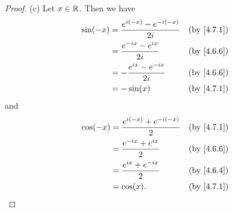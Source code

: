 \begin{proof}{(c)}
  Let \(x \in \mathbb{R}\).
  Then we have
  \begin{align*}
    \sin(-x) & = \frac{e^{i (-x)} - e^{- i (-x)}}{2i} & \text{(by \cref{4.7.1})} \\
             & = \frac{e^{- i x} - e^{i x}}{2i}       & \text{(by \cref{4.6.6})} \\
             & = -\frac{e^{i x} - e^{- i x}}{2i}      & \text{(by \cref{4.6.6})} \\
             & = -\sin(x)                             & \text{(by \cref{4.7.1})}
  \end{align*}
  and
  \begin{align*}
    \cos(-x) & = \frac{e^{i (-x)} + e^{- i (-x)}}{2} & \text{(by \cref{4.7.1})} \\
             & = \frac{e^{- i x} + e^{i x}}{2}       & \text{(by \cref{4.6.6})} \\
             & = \frac{e^{i x} + e^{- i x}}{2}       & \text{(by \cref{4.6.4})} \\
             & = \cos(x).                            & \text{(by \cref{4.7.1})}
  \end{align*}
\end{proof}

